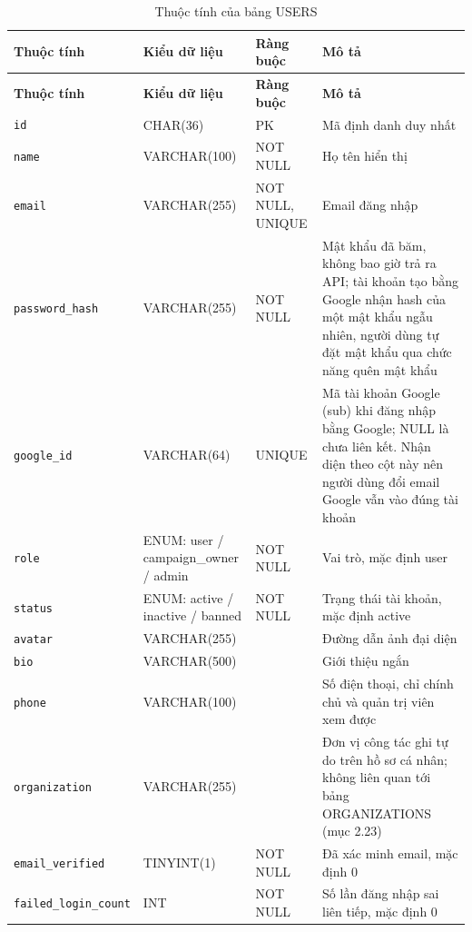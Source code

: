 {\small
\begin{longtable}{|P{3.2cm}|P{2.8cm}|P{2.2cm}|p{5.4cm}|}
    \caption{Thuộc tính của bảng USERS}
    \label{tab:users} \\
    \hline
    \textbf{Thuộc tính} & \textbf{Kiểu dữ liệu} & \textbf{Ràng buộc} & \textbf{Mô tả} \\
    \hline
    \endfirsthead
    \hline
    \textbf{Thuộc tính} & \textbf{Kiểu dữ liệu} & \textbf{Ràng buộc} & \textbf{Mô tả} \\
    \hline
    \endhead

    \texttt{id} & CHAR(36) & PK & Mã định danh duy nhất \\
    \hline
    \texttt{name} & VARCHAR(100) & NOT NULL & Họ tên hiển thị \\
    \hline
    \texttt{email} & VARCHAR(255) & NOT NULL, UNIQUE & Email đăng nhập \\
    \hline
    \texttt{password\_\allowbreak{}hash} & VARCHAR(255) & NOT NULL & Mật khẩu đã băm, không bao giờ trả ra API; tài khoản tạo bằng Google nhận hash của một mật khẩu ngẫu nhiên, người dùng tự đặt mật khẩu qua chức năng quên mật khẩu \\
    \hline
    \texttt{google\_\allowbreak{}id} & VARCHAR(64) & UNIQUE & Mã tài khoản Google (sub) khi đăng nhập bằng Google; NULL là chưa liên kết. Nhận diện theo cột này nên người dùng đổi email Google vẫn vào đúng tài khoản \\
    \hline
    \texttt{role} & ENUM: user / campaign\_\allowbreak{}owner / admin & NOT NULL & Vai trò, mặc định user \\
    \hline
    \texttt{status} & ENUM: active / inactive / banned & NOT NULL & Trạng thái tài khoản, mặc định active \\
    \hline
    \texttt{avatar} & VARCHAR(255) &  & Đường dẫn ảnh đại diện \\
    \hline
    \texttt{bio} & VARCHAR(500) &  & Giới thiệu ngắn \\
    \hline
    \texttt{phone} & VARCHAR(100) &  & Số điện thoại, chỉ chính chủ và quản trị viên xem được \\
    \hline
    \texttt{organization} & VARCHAR(255) &  & Đơn vị công tác ghi tự do trên hồ sơ cá nhân; không liên quan tới bảng ORGANIZATIONS (mục 2.23) \\
    \hline
    \texttt{email\_\allowbreak{}verified} & TINYINT(1) & NOT NULL & Đã xác minh email, mặc định 0 \\
    \hline
    \texttt{failed\_\allowbreak{}login\_\allowbreak{}count} & INT & NOT NULL & Số lần đăng nhập sai liên tiếp, mặc định 0 \\

\end{longtable}}
